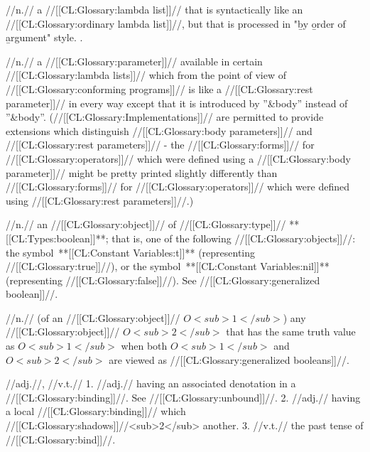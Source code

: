  //n.// a //[[CL:Glossary:lambda list]]// that is syntactically like an //[[CL:Glossary:ordinary lambda list]]//, but that is processed in "\b{b}y \b{o}rder of \b{a}rgument" style. \Seesection\BoaLambdaLists.

 //n.// a //[[CL:Glossary:parameter]]// available in certain //[[CL:Glossary:lambda lists]]// which from the point of view of //[[CL:Glossary:conforming programs]]// is like a //[[CL:Glossary:rest parameter]]// in every way except that it is introduced by ''&body'' instead of ''&body''. (//[[CL:Glossary:Implementations]]// are permitted to provide extensions which distinguish //[[CL:Glossary:body parameters]]// and //[[CL:Glossary:rest parameters]]// - \eg the //[[CL:Glossary:forms]]// for //[[CL:Glossary:operators]]// which were defined using a //[[CL:Glossary:body parameter]]// might be pretty printed slightly differently than //[[CL:Glossary:forms]]// for //[[CL:Glossary:operators]]// which were defined using //[[CL:Glossary:rest parameters]]//.)

 //n.// an //[[CL:Glossary:object]]// of //[[CL:Glossary:type]]// **[[CL:Types:boolean]]**; that is, one of the following //[[CL:Glossary:objects]]//: the symbol~**[[CL:Constant Variables:t]]** (representing //[[CL:Glossary:true]]//), or the symbol~**[[CL:Constant Variables:nil]]** (representing //[[CL:Glossary:false]]//). See //[[CL:Glossary:generalized boolean]]//.

 //n.// (of an //[[CL:Glossary:object]]// $O<sub>1</sub>$) any //[[CL:Glossary:object]]// $O<sub>2</sub>$ that has the same truth value as $O<sub>1</sub>$ when both $O<sub>1</sub>$ and $O<sub>2</sub>$ are viewed as //[[CL:Glossary:generalized booleans]]//.
 
 //adj.//, //v.t.// 1. //adj.// having an associated denotation in a //[[CL:Glossary:binding]]//.  See //[[CL:Glossary:unbound]]//. 2. //adj.// having a local //[[CL:Glossary:binding]]// which //[[CL:Glossary:shadows]]//<sub>2</sub> another.  3. //v.t.// the past tense of //[[CL:Glossary:bind]]//.

